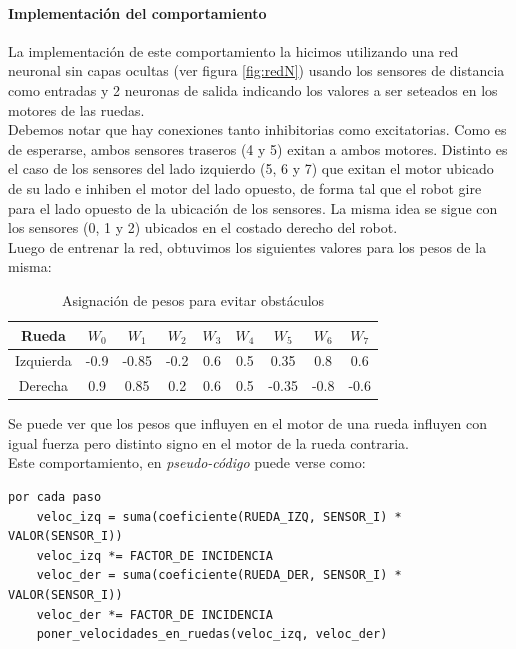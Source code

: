 \paragraph{Implementaci\'on del comportamiento}
La implementaci\'on de este comportamiento la hicimos utilizando una
red neuronal sin capas ocultas (ver figura \ref{fig:redN}) usando los sensores
de distancia como entradas y 2 neuronas de salida indicando los valores a
ser seteados en los motores de las ruedas.
\\\indent
Debemos notar que hay conexiones tanto inhibitorias como excitatorias. Como es
de esperarse, ambos sensores traseros (4 y 5) exitan a ambos motores. Distinto
es el caso de los sensores del lado izquierdo (5, 6 y 7) que exitan el motor
ubicado de su lado e inhiben el motor del lado opuesto, de forma tal que el
robot gire para el lado opuesto de la ubicaci\'on de los sensores. La misma
idea se sigue con los sensores (0, 1 y 2) ubicados en el costado derecho del
robot.
\\\indent
Luego de entrenar la red, obtuvimos los siguientes valores para los pesos de la
misma:

\begin{table}[ht]
	\begin{center}
		\begin{tabular}{ | c | c | c | c | c | c | c | c | c | }
			\hline 
			Rueda & $W_0$ & $W_1$ & $W_2$ & $W_3$ &  $W_4$ & $W_5$ & $W_6$ & $W_7$ \\
			\hline\hline
			Izquierda & -0.9 & -0.85 & -0.2 & 0.6 & 0.5 & 0.35 & 0.8 & 0.6 \\
			\hline
			Derecha & 0.9 & 0.85 & 0.2 & 0.6 & 0.5 & -0.35 & -0.8 & -0.6 \\
			\hline
		\end{tabular}
	\end{center}
	\label{pesos_obstaculo} 
	\caption{Asignaci\'on de pesos para evitar obst\'aculos}
\end{table}
Se puede ver que los pesos que influyen en el motor de una rueda influyen
con igual fuerza pero distinto signo en el motor de la rueda contraria.
\\\indent
Este comportamiento, en \emph{pseudo-c\'odigo} puede verse como:
\begin{verbatim}
por cada paso
    veloc_izq = suma(coeficiente(RUEDA_IZQ, SENSOR_I) * VALOR(SENSOR_I))
    veloc_izq *= FACTOR_DE INCIDENCIA
    veloc_der = suma(coeficiente(RUEDA_DER, SENSOR_I) * VALOR(SENSOR_I))
    veloc_der *= FACTOR_DE INCIDENCIA
    poner_velocidades_en_ruedas(veloc_izq, veloc_der)
\end{verbatim}

